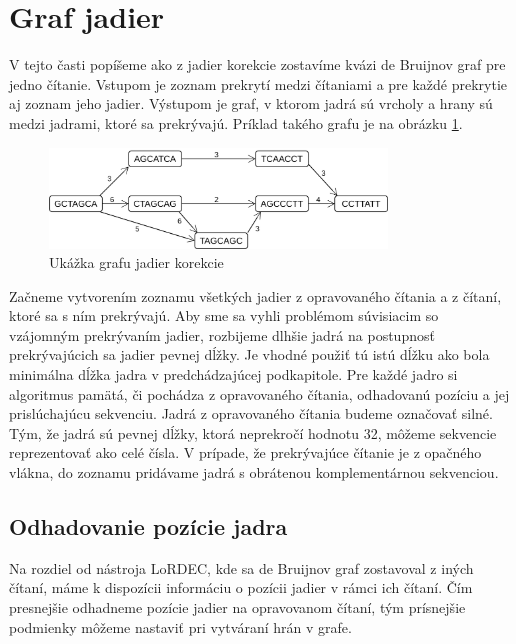 \section{Graf jadier}

V tejto časti popíšeme ako z jadier korekcie zostavíme kvázi de Bruijnov graf pre jedno čítanie. Vstupom je zoznam prekrytí medzi čítaniami a pre každé prekrytie aj zoznam jeho jadier. Výstupom je graf, v ktorom jadrá sú vrcholy a hrany sú medzi jadrami, ktoré sa prekrývajú. Príklad takého grafu je na obrázku \ref{fig:pseudo_debruijn}.

\begin{figure}
    \centering
    \includegraphics[width=0.8\textwidth]{images/pseudo_debruijn.png}
    \caption{Ukážka grafu jadier korekcie}
    \label{fig:pseudo_debruijn}
\end{figure} 

Začneme vytvorením zoznamu všetkých jadier z opravovaného čítania a z čítaní, ktoré sa s ním prekrývajú. Aby sme sa vyhli problémom súvisiacim so vzájomným prekrývaním jadier, rozbijeme dlhšie jadrá na postupnosť prekrývajúcich sa jadier pevnej dĺžky. Je vhodné použiť tú istú dĺžku ako bola minimálna dĺžka jadra v predchádzajúcej podkapitole. Pre každé jadro si algoritmus pamätá, či pochádza z opravovaného čítania, odhadovanú pozíciu a jej prislúchajúcu sekvenciu. Jadrá z opravovaného čítania budeme označovať silné. Tým, že jadrá sú pevnej dĺžky, ktorá neprekročí hodnotu 32, môžeme sekvencie reprezentovať ako celé čísla. V prípade, že prekrývajúce čítanie je z opačného vlákna, do zoznamu pridávame jadrá s obrátenou komplementárnou sekvenciou.

\subsection{Odhadovanie pozície jadra}

Na rozdiel od nástroja LoRDEC, kde sa de Bruijnov graf zostavoval z iných čítaní, máme k dispozícii informáciu o pozícii jadier v rámci ich čítaní. Čím presnejšie odhadneme pozície jadier na opravovanom čítaní, tým prísnejšie podmienky môžeme nastaviť pri vytváraní hrán v grafe. 

